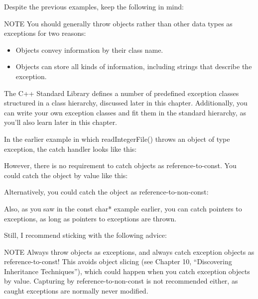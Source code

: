 Despite the previous examples, keep the following in mind:

\begin{myNotic}{NOTE}
You should generally throw objects rather than other data types as exceptions for two reasons:

\begin{itemize}
\item
Objects convey information by their class name.

\item
Objects can store all kinds of information, including strings that describe the exception.
\end{itemize}
\end{myNotic}

The C++ Standard Library defines a number of predefined exception classes structured in a class hierarchy, discussed later in this chapter. Additionally, you can write your own exception classes and fit them in the standard hierarchy, as you’ll also learn later in this chapter.


In the earlier example in which readIntegerFile() throws an object of type exception, the catch handler looks like this:

\begin{cpp}
} catch (const exception& e) {
\end{cpp}

However, there is no requirement to catch objects as reference-to-const. You could catch the object by value like this:

\begin{cpp}
} catch (exception e) {
\end{cpp}

Alternatively, you could catch the object as reference-to-non-const:

\begin{cpp}
} catch (exception& e) {
\end{cpp}

Also, as you saw in the const char* example earlier, you can catch pointers to exceptions, as long as pointers to exceptions are thrown.

Still, I recommend sticking with the following advice:

\begin{myNotic}{NOTE}
Always throw objects as exceptions, and always catch exception objects as reference-to-const! This avoids object slicing (see Chapter 10, “Discovering Inheritance Techniques”), which could happen when you catch exception objects by value. Capturing by reference-to-non-const is not recommended either, as caught exceptions are normally never modified.
\end{myNotic}

